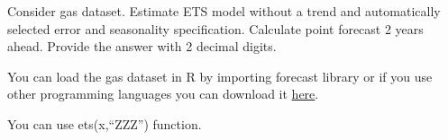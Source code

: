 
\begin{question}
Consider gas dataset. Estimate ETS model without a trend and automatically selected error and seasonality specification. Calculate point forecast 2 years ahead. Provide the answer with 2 decimal digits.

You can load the gas dataset in R by importing forecast library or if you use other programming languages you can download it \href{https://github.com/vincentarelbundock/Rdatasets/blob/master/csv/forecast/gas.csv}{here}.
\end{question}

\begin{solution}
You can use ets(x,``ZZZ'') function.
\end{solution}


